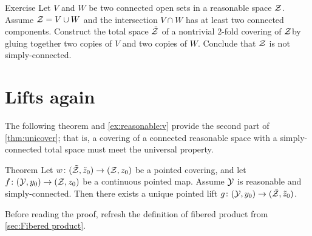 \begin{thm}[!]{Exercise}\label{ex:vankam-nonconnect}
Let $V$ and $W$ be two connected open sets in a reasonable space $\mathcal{Z}$.
Assume $\mathcal{Z}=V\cup W$ and the intersection $V\cap W$ has at least two connected components.
Construct the total space $\tilde{\mathcal{Z}}$ of a nontrivial 2-fold covering of $\mathcal{Z}$by gluing together two copies of $V$ and two copies of $W$.
Conclude that $\mathcal{Z}$ is not simply-connected.
\end{thm}

\section{Lifts again}\label{sec:Lifts again}

The following theorem and \ref{ex:reasonable:v} provide the second part of \ref{thm:unicover}; that is, a covering of a connected reasonable space with a simply-connected total space must meet the universal property.

{

\begin{figure}
\vskip-0mm
\centering
{}
\end{figure}

\begin{thm}{Theorem}\label{thm:lifting-criterion}
Let $w\:(\tilde{\c{Z}},\tilde z_0)\z\to (\c{Z},z_0)$ be a pointed covering, and let $f\:(\c{Y},y_0)\z\to (\c{Z},z_0)$ be a continuous pointed map.
Assume $\mathcal{Y}$ is reasonable and simply-connected.
Then there exists a unique pointed lift $g\:(\c{Y},y_0)\z\to (\tilde{\c{Z}},\tilde z_0)$.
\end{thm}

}


Before reading the proof, refresh the definition of fibered product from \ref{sec:Fibered product}.

